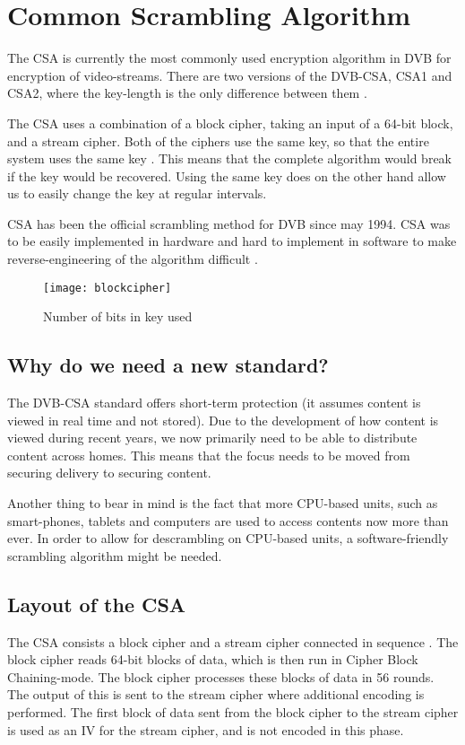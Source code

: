 \chapter{Common Scrambling Algorithm} \label{ch:CSA}
The CSA is currently the most commonly used encryption algorithm in DVB
for encryption of video-streams. There are two versions of the DVB-CSA,
CSA1 and CSA2, where the key-length is the only difference between them
\citep[p. 23]{DVBScene:2013}. 

The CSA uses a combination of a block cipher, taking an input of a 
64-bit block, and a stream cipher. Both of the ciphers use the same 
key, so that the entire system uses the same key 
\citep[pp. 271--272]{WeiLi:2007}. This means that the complete 
algorithm would break if the key would be recovered. Using the same key 
does on the other hand allow us to easily change the key at regular 
intervals. 

CSA has been the official scrambling method for DVB since may 1994. CSA 
was to be easily implemented in hardware and hard to implement in 
software to make reverse-engineering of the algorithm difficult 
\citep{DVBScene:2013}.

\begin{figure}
  \begin{center}
    \texttt{[image: blockcipher]}
  \end{center}
  \caption{Number of bits in key used}
  \label{fig:blockcipher}
\end{figure}

\section{Why do we need a new standard?}
The DVB-CSA standard offers short-term protection (it assumes content 
is viewed in real time and not stored). Due to the development of how 
content is viewed during recent years, we now primarily need to be able 
to distribute content across homes. This means that the focus needs to 
be moved from securing delivery to securing content. \citep{Farncombe}

Another thing to bear in mind is the fact that more CPU-based units, 
such as smart-phones, tablets and computers are used to access contents 
now more than ever. In order to allow for descrambling on CPU-based 
units, a software-friendly scrambling algorithm might be needed.

\section{Layout of the CSA}
The CSA consists a block cipher and a stream cipher connected in 
sequence \citep[p. 271]{WeiLi:2007}. The block cipher reads 64-bit 
blocks of data, which is then run in Cipher Block Chaining-mode. The 
block cipher processes these blocks of data in 56 rounds. The output of 
this is sent to the stream cipher where additional encoding is 
performed. The first block of data sent from the block cipher to the 
stream cipher is used as an IV for the stream cipher, and is not 
encoded in this phase. \citep{DVBAnalysis:2006}

